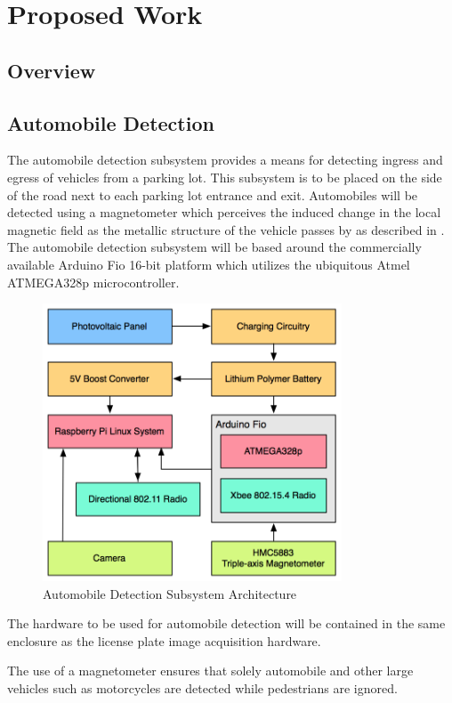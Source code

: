 \documentclass[11pt, oneside, fullpage, doublespace]{article}
\begin{document}
\section{Proposed Work}
\subsection{Overview}

\subsection{Automobile Detection}
The automobile detection subsystem provides a means for detecting ingress and egress of vehicles from a parking lot. This subsystem is to be placed on the side of the road next to each parking lot entrance and exit. Automobiles will be detected using a magnetometer which perceives the induced change in the local magnetic field as the metallic structure of the vehicle passes by as described in \cite{stillwell2013}. The automobile detection subsystem will be based around the commercially available Arduino Fio 16-bit  platform which utilizes the ubiquitous Atmel ATMEGA328p microcontroller.

\begin{figure}
\begin{center}
\includegraphics[width=3.5in]{autodetection}
\end{center}
\caption{Automobile Detection Subsystem Architecture}
\end{figure}

The hardware to be used for automobile detection will be contained in the same enclosure as the license plate image acquisition hardware.

The use of a magnetometer ensures that solely automobile and other large vehicles such as motorcycles are detected while pedestrians are ignored.
\end{document}

